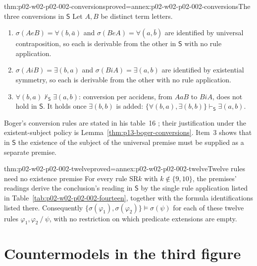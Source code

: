 \begin{hblemma}{thm:p02-w02-p02-002-conversions}{proved=annex:p02-w02-p02-002-conversions}{The three conversions in \(\mathsf S\)}
Let \(A,B\) be distinct term letters.
\begin{enumerate}
\item \(\sigma(AeB)=\forall(b,\bar a)\) and \(\sigma(BeA)=\forall(a,\bar b)\)
 are identified by universal contraposition, so each is derivable from the
 other in \(\mathsf S\) with no rule application.
\item \(\sigma(AiB)=\exists(b,a)\) and \(\sigma(BiA)=\exists(a,b)\) are
 identified by existential symmetry, so each is derivable from the other
 with no rule application.
\item \(\forall(b,a)\nvdash_{\mathsf S}\exists(a,b)\): conversion per
 accidens, from \(AaB\) to \(BiA\), does not hold in \(\mathsf S\). It holds
 once \(\exists(b,b)\) is added:
 \(\{\forall(b,a),\exists(b,b)\}\vdash_{\mathsf S}\exists(a,b)\).
\end{enumerate}
\end{hblemma}

Boger's conversion rules are stated in his table~16
\cite[p.~183]{Boger2004UnderlyingLogic}; their justification under the
existent-subject policy is Lemma~\ref{thm:p13-boger-conversions}. Item~3
shows that in \(\mathsf S\) the existence of the subject of the universal
premise must be supplied as a separate premise.

\begin{hbtheorem}{thm:p02-w02-p02-002-twelve}{proved=annex:p02-w02-p02-002-twelve}{Twelve rules need no existence premise}
For every rule SR\(k\) with \(k\notin\{9,10\}\), the premises' readings
derive the conclusion's reading in \(\mathsf S\) by the single rule
application listed in Table~\ref{tab:p02-w02-p02-002-fourteen}, together
with the formula identifications listed there. Consequently
\(\{\sigma(\varphi_1),\sigma(\varphi_2)\}\models\sigma(\psi)\) for each of
these twelve rules \(\varphi_1,\varphi_2\mathbin{/}\psi\), with no
restriction on which predicate extensions are empty.
\end{hbtheorem}

\section{Countermodels in the third figure}
\label{sec:p02-w02-p02-002-countermodels}

